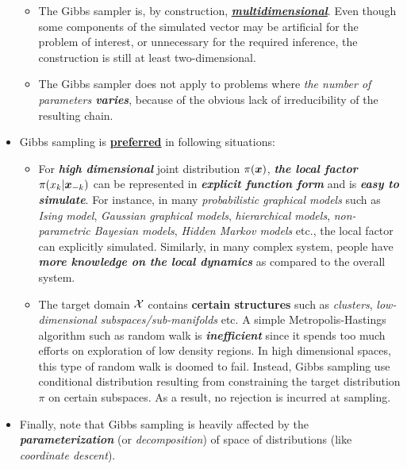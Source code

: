 \documentclass[11pt]{article}
\begin{document}
\begin{itemize}
\begin{itemize}
\item The Gibbs sampler is, by construction, \underline{\emph{\textbf{multidimensional}}}. Even though some components of the simulated vector may be artificial for the problem of interest, or unnecessary for the required inference, the construction is still at least two-dimensional.

\item The Gibbs sampler does not apply to problems where \emph{the number of parameters \textbf{varies}}, because of the obvious lack of irreducibility of the resulting chain.
\end{itemize}

\item Gibbs sampling is \underline{\textbf{preferred}} in following situations:
\begin{itemize}
\item For \textbf{\emph{high dimensional}} joint distribution $\pi(\boldsymbol{x})$, \emph{\textbf{the local factor}} $\pi(x_k | \boldsymbol{x}_{-k})$ can be represented in \emph{\textbf{explicit function form}} and is \emph{\textbf{easy to simulate}}. For instance, in many \emph{probabilistic graphical models} such as \emph{Ising model}, \emph{Gaussian graphical models}, \emph{hierarchical models}, \emph{non-parametric Bayesian models}, \emph{Hidden Markov models} etc., the local factor can explicitly simulated.  Similarly, in many complex system, people have \emph{\textbf{more knowledge on the local dynamics}} as compared to the overall system. 

\item The target domain ${\mathcal X}$ contains \textbf{certain structures} such as \emph{clusters}, \emph{low-dimensional subspaces/sub-manifolds} etc. A simple Metropolis-Hastings algorithm such as random walk is \textbf{\emph{inefficient}} since it spends too much efforts on exploration of low density regions. In high dimensional spaces, this type of random walk is doomed to fail. Instead, Gibbs sampling use conditional distribution resulting from constraining the target distribution $\pi$ on certain subspaces. As a result, no rejection is incurred at sampling.
\end{itemize}

\item Finally, note that Gibbs sampling is heavily affected by the \textbf{\emph{parameterization}} (or \emph{decomposition}) of space of distributions (like \emph{coordinate descent}). 
\end{itemize}
\end{document}
